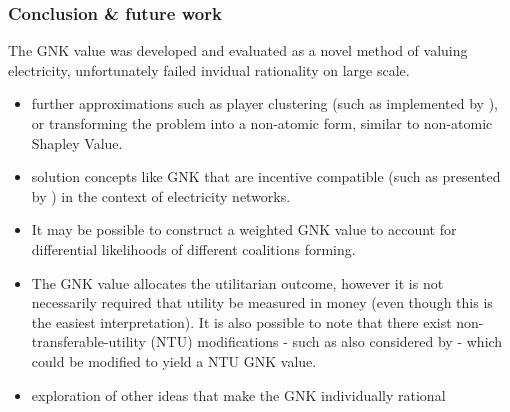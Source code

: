 \begin{frame}
\frametitle{Conclusion \& future work}
The GNK value was developed and evaluated as a novel method of valuing electricity, unfortunately failed invidual rationality on large scale.
\begin{itemize}
\item	further approximations such as player clustering (such as implemented by \cite{DBLP:journals/corr/abs-1903-10965}), or transforming the problem into a non-atomic form, similar to non-atomic Shapley Value.
\item	solution concepts like GNK that are incentive compatible (such as presented by \cite{myerson1,Salamanca2019}) in the context of electricity networks.
\item	It may be possible to construct a weighted GNK value to account for differential likelihoods of different coalitions forming.
\item	The GNK value allocates the utilitarian outcome, however it is not necessarily required that utility be measured in money (even though this is the easiest interpretation).
It is also possible to note that there exist non-transferable-utility (NTU) modifications - such as also considered by \cite{value1} - which could be modified to yield a NTU GNK value.
\item	exploration of other ideas that make the GNK individually rational
\end{itemize}

\end{frame}

